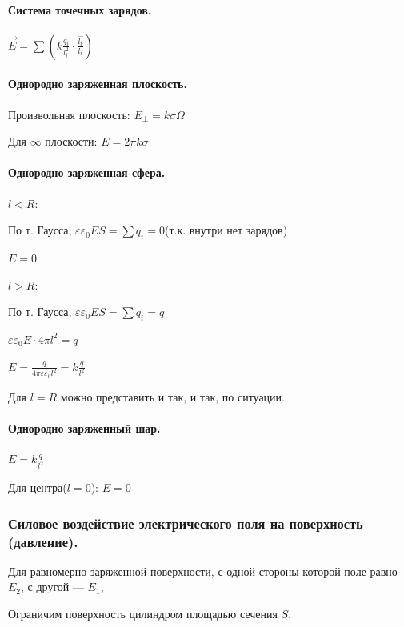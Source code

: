 \documentclass{article}
\begin{document}
            \paragraph{Система точечных зарядов.}
                \(\vec E = \sum{(k\frac{q_i}{l_i^2} \cdot \frac{\vec{l_i}}{l_i})}\)
            \paragraph{Однородно заряженная плоскость.}
                Произвольная плоскость: \(E_\perp = k \sigma \Omega\)

                Для \(\infty\) плоскости: \(E = 2\pi k \sigma\)
            \paragraph{Однородно заряженная сфера.}
                \(l < R\): 
                
                По т. Гаусса, \(\varepsilon \varepsilon_0 E S = \sum{q_i} = 0\)(т.к. внутри нет зарядов)

                \(E = 0\)

                \(l > R\): 
                
                По т. Гаусса, \(\varepsilon \varepsilon_0 E S = \sum{q_i} = q\)
                
                \(\varepsilon \varepsilon_0 E \cdot 4\pi l^2 = q\)

                \(E = \frac{q}{4\pi \varepsilon \varepsilon_0 l^2} = k\frac{q}{l^2}\)

                Для \(l = R\) можно представить и так, и так, по ситуации.
            \paragraph{Однородно заряженный шар.}
                \(E = k\frac{q}{l^2}\)

                Для центра(\(l = 0\)): \(E = 0\)
        \subsubsection{Силовое воздействие электрического поля на поверхность (давление).}
                Для равномерно заряженной поверхности, с одной стороны которой поле равно \(E_2\), с другой --- \(E_1\), 
                
                Ограничим поверхность цилиндром площадью сечения \(S\).
\end{document}

